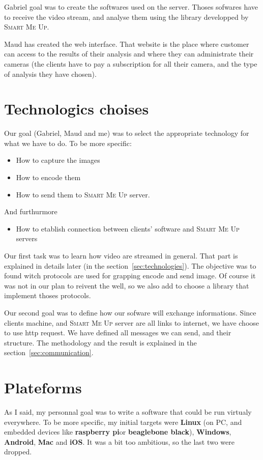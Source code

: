\documentclass[a4paper,11pt]{custom}
\newcommand{\smu}{\textsc{Smart Me Up}}
\newcommand{\rpi}{\textbf{raspberry pi}}
\newcommand{\bbb}{\textbf{beaglebone black}}
\newcommand{\linux}{\textbf{Linux}}
\newcommand{\win}{\textbf{Windows}}
\newcommand{\mac}{\textbf{Mac}}
\newcommand{\android}{\textbf{Android}}
\newcommand{\ios}{\textbf{iOS}}
\begin{document}
Gabriel goal was to create the softwares used on the server. Thoses sofwares
have to receive the video stream, and analyse them using the library developped
by \smu.

Maud has created the web interface. That website is the place where customer can
access to the results of their analysis and where they can administrate their
cameras (the clients have to pay a subscription for all their camera, and the
type of analysis they have chosen).

\section{Technologics choises}

Our goal (Gabriel, Maud and me) was to select the appropriate technology for
what we have to do. To be more specific:
\begin{itemize}
\item How to capture the images
\item How to encode them
\item How to send them to \smu{} server.
\end{itemize}

And furthurmore
\begin{itemize}
\item How to etablish connection between clients' software and \smu{} servers
\end{itemize}

Our first task was to learn how video are streamed in general. That part is
explained in details later (in the section~\ref{sec:technologies}). The objective
was to found witch protocols are used for grapping encode and send image. Of
course it was not in our plan to reivent the well, so we also add to choose a
library that implement thoses protocols.

Our second goal was to define how our sofware will exchange informations. Since
clients machine, and \smu{} server are all links to internet, we have choose to
use http request. We have defined all messages we can send, and their
structure. The methodology and the result is explained in the
section~\ref{sec:communication}.

\section{Plateforms}

As I said, my personnal goal was to write a software that could be run virtualy
everywhere. To be more specific, my initial targets were \linux{} (on PC, and
embedded devices like \rpi or \bbb), \win, \android, \mac{} and \ios. It was a
bit too ambitious, so the last two were dropped.
\end{document}
